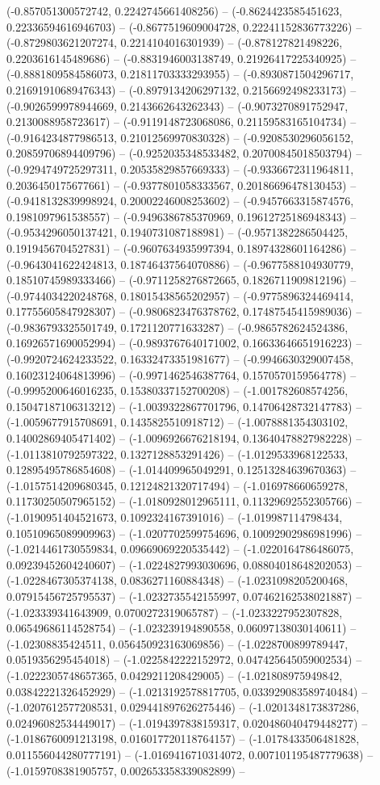 (-0.857051300572742, 0.2242745661408256) -- (-0.8624423585451623, 0.22336594616946703) -- (-0.8677519609004728, 0.22241152836773226) -- (-0.8729803621207274, 0.2214104016301939) -- (-0.878127821498226, 0.2203616145489686) -- (-0.8831946003138749, 0.21926417225340925) -- (-0.8881809584586073, 0.21811703333293955) -- (-0.8930871504296717, 0.21691910689476343) -- (-0.8979134206297132, 0.2156692498233173) -- (-0.9026599978944669, 0.2143662643262343) -- (-0.9073270891752947, 0.2130088958723617) -- (-0.9119148723068086, 0.21159583165104734) -- (-0.9164234877986513, 0.21012569970830328) -- (-0.9208530296056152, 0.20859706894409796) -- (-0.9252035348533482, 0.20700845018503794) -- (-0.9294749725297311, 0.20535829857669333) -- (-0.9336672311964811, 0.2036450175677661) -- (-0.9377801058333567, 0.20186696478130453) -- (-0.9418132839998924, 0.20002246008253602) -- (-0.9457663315874576, 0.1981097961538557) -- (-0.9496386785370969, 0.19612725186948343) -- (-0.9534296050137421, 0.1940731087188981) -- (-0.9571382286504425, 0.1919456704527831) -- (-0.9607634935997394, 0.18974328601164286) -- (-0.9643041622424813, 0.18746437564070886) -- (-0.9677588104930779, 0.18510745989333466) -- (-0.9711258276872665, 0.1826711909812196) -- (-0.9744034220248768, 0.18015438565202957) -- (-0.9775896324469414, 0.17755605847928307) -- (-0.9806823476378762, 0.17487545415989036) -- (-0.9836793325501749, 0.1721120771633287) -- (-0.9865782624524386, 0.16926571690052994) -- (-0.9893767640171002, 0.16633646651916223) -- (-0.9920724624233522, 0.16332473351981677) -- (-0.9946630329007458, 0.16023124064813996) -- (-0.9971462546387764, 0.1570570159564778) -- (-0.9995200646016235, 0.15380337152700208) -- (-1.001782608574256, 0.15047187106313212) -- (-1.0039322867701796, 0.14706428732147783) -- (-1.0059677915708691, 0.1435825510918712) -- (-1.0078881354303102, 0.14002869405471402) -- (-1.0096926676218194, 0.13640478827982228) -- (-1.0113810792597322, 0.1327128853291426) -- (-1.0129533968122533, 0.12895495786854608) -- (-1.014409965049291, 0.12513284639670363) -- (-1.0157514209680345, 0.12124821320717494) -- (-1.016978660659278, 0.11730250507965152) -- (-1.0180928012965111, 0.11329692552305766) -- (-1.0190951404521673, 0.1092324167391016) -- (-1.019987114798434, 0.10510965089909963) -- (-1.0207702599754696, 0.10092902986981996) -- (-1.0214461730559834, 0.09669069220535442) -- (-1.0220164786486075, 0.09239452604240607) -- (-1.0224827993030696, 0.08804018648202053) -- (-1.0228467305374138, 0.0836271160884348) -- (-1.0231098205200468, 0.07915456725795537) -- (-1.0232735542155997, 0.07462162538021887) -- (-1.023339341643909, 0.0700272319065787) -- (-1.0233227952307828, 0.06549686114528754) -- (-1.023239194890558, 0.06097138030140611) -- (-1.02308835424511, 0.056450923163069856) -- (-1.0228700899789447, 0.0519356295454018) -- (-1.0225842222152972, 0.047425645059002534) -- (-1.0222305748657365, 0.0429211208429005) -- (-1.021808975949842, 0.03842221326452929) -- (-1.0213192578817705, 0.033929083589740484) -- (-1.0207612577208531, 0.029441897626275446) -- (-1.0201348173837286, 0.02496082534449017) -- (-1.0194397838159317, 0.020486040479448277) -- (-1.0186760091213198, 0.016017720118764157) -- (-1.0178433506481828, 0.011556044280777191) -- (-1.0169416710314072, 0.007101195487779638) -- (-1.0159708381905757, 0.002653358339082899) -- 